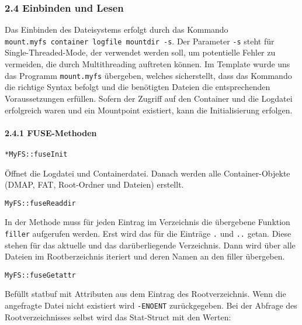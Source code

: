 \documentclass[]{article}
\let\oldparagraph\paragraph
\renewcommand{\paragraph}[1]{\oldparagraph{#1}\mbox{}}
\begin{document}
\hypertarget{einbinden-und-lesen}{%
\subsubsection{2.4 Einbinden und Lesen}\label{einbinden-und-lesen}}

Das Einbinden des Dateisystems erfolgt durch das Kommando
\texttt{mount.myfs\ container\ logfile\ mountdir\ -s}. Der Parameter
\texttt{-s} steht für Single-Threaded-Mode, der verwendet werden soll, um
potentielle Fehler zu vermeiden, die durch Multithreading auftreten
können. Im Template wurde uns das Programm \texttt{mount.myfs}
übergeben, welches sicherstellt, dass das Kommando die richtige Syntax
befolgt und die benötigten Dateien die entsprechenden Voraussetzungen erfüllen. Sofern der
Zugriff auf den Container und die Logdatei erfolgreich waren und ein
Mountpoint existiert, kann die Initialisierung erfolgen.

\hypertarget{fuse-methoden}{%
\paragraph{2.4.1 FUSE-Methoden}\label{fuse-methoden}}

\texttt{*MyFS::fuseInit}

Öffnet die Logdatei und Containerdatei. Danach werden alle
Container-Objekte (DMAP, FAT, Root-Ordner und Dateien) erstellt.

\texttt{MyFS::fuseReaddir}

In der Methode muss für jeden Eintrag im Verzeichnis die übergebene
Funktion \texttt{filler} aufgerufen werden. Erst wird das für die
Einträge \texttt{.} und \texttt{..} getan. Diese stehen für das aktuelle
und das darüberliegende Verzeichnis. Dann wird über alle Dateien im
Rootberzeichnis iteriert und deren Namen an den filler übergeben.

\texttt{MyFS::fuseGetattr}

Befüllt statbuf mit Attributen aus dem Eintrag des Rootverzeichnis. Wenn
die angefragte Datei nicht existiert wird \texttt{-ENOENT}
zurückgegeben. Bei der Abfrage des Rootverzeichnisses selbst wird das
Stat-Struct mit den Werten:
\end{document}
